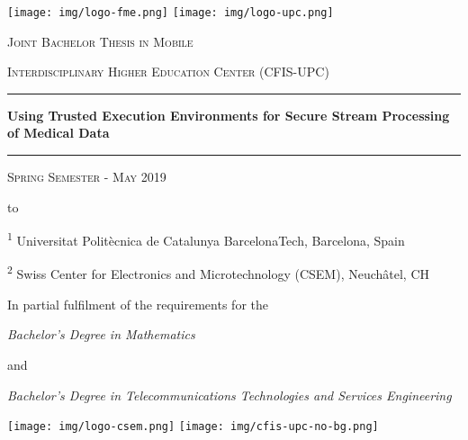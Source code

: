 \thispagestyle{empty}
\begin{center}

    \texttt{[image: img/logo-fme.png]} 
    \hfill
    \texttt{[image: img/logo-upc.png]}

    \vspace{0.5cm}

    \Large
    \textsc{Joint Bachelor Thesis in Mobile} 

    \textsc{Interdisciplinary Higher Education Center (CFIS-UPC)}

    \LARGE
    \rule{\textwidth}{0.4pt}
    \textbf{Using Trusted Execution Environments for Secure Stream Processing of Medical Data}
    \rule[0.5cm]{\textwidth}{0.4pt}

    \vspace{-0.2cm}
    \Large
    \textsc{Spring Semester - May 2019}
    \vspace{0.7cm}

    \normalsize
    \leavevmode\hbox to 

    \vspace{1cm}
    \footnotesize
    \textsuperscript{1} Universitat Polit\`ecnica de Catalunya BarcelonaTech, Barcelona, Spain

    \textsuperscript{2} Swiss Center for Electronics and Microtechnology (CSEM), Neuch\^atel, CH

    \vspace{1cm}
    \normalsize
    In partial fulfilment of the requirements for the

    \textit{Bachelor's Degree in Mathematics}

    and

    \textit{Bachelor's Degree in Telecommunications Technologies and Services Engineering}

    \vfill
    \texttt{[image: img/logo-csem.png]} 
    \hfill
    \texttt{[image: img/cfis-upc-no-bg.png]}

\end{center}
